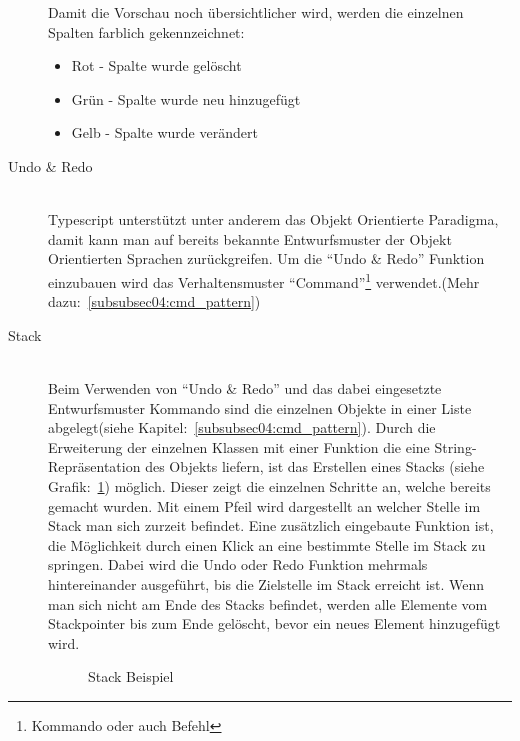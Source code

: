\begin{description}
Damit die Vorschau noch übersichtlicher wird, werden die einzelnen Spalten farblich gekennzeichnet:
\begin{itemize}
    \item Rot - Spalte wurde gelöscht
    \item Grün - Spalte wurde neu hinzugefügt
    \item Gelb - Spalte wurde verändert
\end{itemize}

\item[Undo \& Redo] \hfill\\
Typescript unterstützt unter anderem das Objekt Orientierte Paradigma, damit kann man auf bereits bekannte Entwurfsmuster der Objekt Orientierten Sprachen zurückgreifen. 
Um die ``Undo \& Redo'' Funktion einzubauen wird das Verhaltensmuster ``Command''\footnote{Kommando oder auch Befehl} verwendet.(Mehr dazu:~\ref{subsubsec04:cmd_pattern})

\item[Stack] \hfill\\
Beim Verwenden von ``Undo \& Redo'' und das dabei eingesetzte Entwurfsmuster Kommando sind die einzelnen Objekte in einer Liste abgelegt(siehe Kapitel:~\ref{subsubsec04:cmd_pattern}).
Durch die Erweiterung der einzelnen Klassen mit einer Funktion die eine String-Repräsentation des Objekts liefern, ist das Erstellen eines Stacks (siehe Grafik:~\ref{pic:stack}) möglich. Dieser zeigt die einzelnen Schritte an, welche bereits gemacht wurden. Mit einem Pfeil wird dargestellt an welcher Stelle im Stack man sich zurzeit befindet. Eine zusätzlich eingebaute Funktion ist, die Möglichkeit durch einen Klick an eine bestimmte Stelle im Stack zu springen. Dabei wird die Undo oder Redo Funktion mehrmals hintereinander ausgeführt, bis die Zielstelle im Stack erreicht ist. Wenn man sich nicht am Ende des Stacks befindet, werden alle Elemente vom Stackpointer bis zum Ende gelöscht, bevor ein neues Element hinzugefügt wird. 

\begin{figure}[ht]
        \centering
        \caption{Stack Beispiel}
        \label{pic:stack}
\end{figure}
\end{description}

